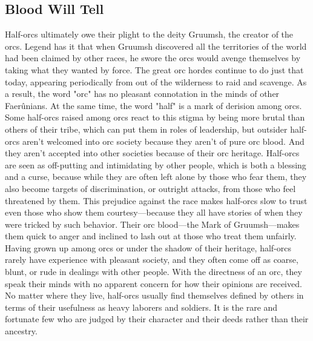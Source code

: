 \documentclass[10pt,a4paper,twoside,twocolumn,openany,bg=print,nodeprecatedcode]{dndbook}
\begin{document}
\subsection{Blood Will Tell}
Half-orcs ultimately owe their plight to the deity Gruumsh, the creator of the orcs. Legend has it that when Gruumsh discovered all the territories of the world had been claimed by other races, he swore the orcs would avenge themselves by taking what they wanted by force. The great orc hordes continue to do just that today, appearing periodically from out of the wilderness to raid and scavenge.
As a result, the word "orc" has no pleasant connotation in the minds of other Faerûnians. At the same time, the word "half" is a mark of derision among orcs. Some half-orcs raised among orcs react to this stigma by being more brutal than others of their tribe, which can put them in roles of leadership, but outsider half-orcs aren't welcomed into orc society because they aren't of pure orc blood. And they aren't accepted into other societies because of their orc heritage.
Half-orcs are seen as off-putting and intimidating by other people, which is both a blessing and a curse, because while they are often left alone by those who fear them, they also become targets of discrimination, or outright attacks, from those who feel threatened by them. This prejudice against the race makes half-orcs slow to trust even those who show them courtesy—because they all have stories of when they were tricked by such behavior. Their orc blood—the Mark of Gruumsh—makes them quick to anger and inclined to lash out at those who treat them unfairly.
Having grown up among orcs or under the shadow of their heritage, half-orcs rarely have experience with pleasant society, and they often come off as coarse, blunt, or rude in dealings with other people. With the directness of an orc, they speak their minds with no apparent concern for how their opinions are received. No matter where they live, half-orcs usually find themselves defined by others in terms of their usefulness as heavy laborers and soldiers. It is the rare and fortunate few who are judged by their character and their deeds rather than their ancestry.
\end{document}
